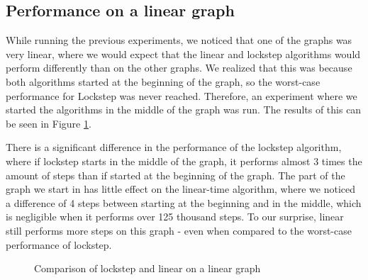 \documentclass[../master/master.tex]{subfiles}
\begin{document}
\subsection{Performance on a linear graph}
While running the previous experiments, we noticed that one of the graphs was very linear, where we would expect that the linear and lockstep algorithms would perform differently than on the other graphs. We realized that this was because both algorithms started at the beginning of the graph, so the worst-case performance for Lockstep was never reached. Therefore, an experiment where we started the algorithms in the middle of the graph was run. The results of this can be seen in Figure \ref{barchart}.

There is a significant difference in the performance of the lockstep algorithm, where if lockstep starts in the middle of the graph, it performs almost 3 times the amount of steps than if started at the beginning of the graph. The part of the graph we start in has little effect on the linear-time algorithm, where we noticed a difference of 4 steps between starting at the beginning and in the middle, which is negligible when it performs over 125 thousand steps. To our surprise, linear still performs more steps on this graph - even when compared to the worst-case performance of lockstep.
\begin{figure}
\centering
{}
\caption{Comparison of lockstep and linear on a linear graph}\label{barchart}
\end{figure}
\end{document}
